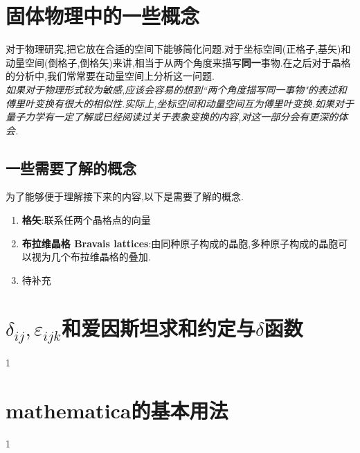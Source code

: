 \documentclass[lang=cn,newtx,10pt,scheme=chinese,thmcnt=section]{elegantbook}
\begin{document}
\chapter{固体物理中的一些概念}
对于物理研究,把它放在合适的空间下能够简化问题.对于坐标空间(正格子,基矢)和动量空间(倒格子,倒格矢)来讲,相当于从两个角度来描写\textbf{同一}事物.在之后对于晶格的分析中,我们常常要在动量空间上分析这一问题.\\
\textit{如果对于物理形式较为敏感,应该会容易的想到``两个角度描写同一事物"的表述和傅里叶变换有很大的相似性.实际上,坐标空间和动量空间互为傅里叶变换.如果对于量子力学有一定了解或已经阅读过关于表象变换的内容,对这一部分会有更深的体会.}
\section*{一些需要了解的概念}
为了能够便于理解接下来的内容,以下是需要了解的概念.
\begin{enumerate}
	\item \textbf{格矢}:联系任两个晶格点的向量
	\item \textbf{布拉维晶格 Bravais lattices}:由同种原子构成的晶胞,多种原子构成的晶胞可以视为几个布拉维晶格的叠加.
	\item 待补充
\end{enumerate}


\chapter{$\delta_{ij},\varepsilon_{ijk}$和爱因斯坦求和约定与$\delta$函数}
1
\chapter{mathematica的基本用法}
1
\end{document}
